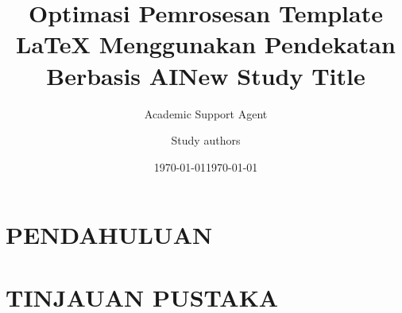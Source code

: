 \documentclass{prereg}
\title{Optimasi Pemrosesan Template LaTeX Menggunakan Pendekatan Berbasis AI}
\author{Academic Support Agent}
\date{\today}
\begin{document}
\maketitle

\begin{abstract}

\end{abstract}

\chapter{PENDAHULUAN}


\chapter{TINJAUAN PUSTAKA}


\usepackage[utf8]{inputenc}

\title{New Study Title}
\author{Study authors}
\def\version{1}
\date{\today}
\end{document}
